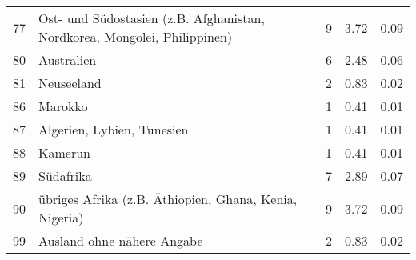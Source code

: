 \begin{longtable}{lXrrr}
        77 & \multicolumn{1}{X}{Ost- und Südostasien (z.B. Afghanistan, Nordkorea, Mongolei, Philippinen)} & %
          \num{9} &
          \num[round-mode=places,round-precision=2]{3,72} &
          \num[round-mode=places,round-precision=2]{0,09} \\

        80 & \multicolumn{1}{X}{Australien} & %
          \num{6} &
          \num[round-mode=places,round-precision=2]{2,48} &
          \num[round-mode=places,round-precision=2]{0,06} \\

        81 & \multicolumn{1}{X}{Neuseeland} & %
          \num{2} &
          \num[round-mode=places,round-precision=2]{0,83} &
          \num[round-mode=places,round-precision=2]{0,02} \\

        86 & \multicolumn{1}{X}{Marokko} & %
          \num{1} &
          \num[round-mode=places,round-precision=2]{0,41} &
          \num[round-mode=places,round-precision=2]{0,01} \\

        87 & \multicolumn{1}{X}{Algerien, Lybien, Tunesien} & %
          \num{1} &
          \num[round-mode=places,round-precision=2]{0,41} &
          \num[round-mode=places,round-precision=2]{0,01} \\

        88 & \multicolumn{1}{X}{Kamerun} & %
          \num{1} &
          \num[round-mode=places,round-precision=2]{0,41} &
          \num[round-mode=places,round-precision=2]{0,01} \\

        89 & \multicolumn{1}{X}{Südafrika} & %
          \num{7} &
          \num[round-mode=places,round-precision=2]{2,89} &
          \num[round-mode=places,round-precision=2]{0,07} \\

        90 & \multicolumn{1}{X}{übriges Afrika (z.B. Äthiopien, Ghana, Kenia, Nigeria)} & %
          \num{9} &
          \num[round-mode=places,round-precision=2]{3,72} &
          \num[round-mode=places,round-precision=2]{0,09} \\

        99 & \multicolumn{1}{X}{Ausland ohne nähere Angabe} & %
          \num{2} &
          \num[round-mode=places,round-precision=2]{0,83} &
          \num[round-mode=places,round-precision=2]{0,02} \\


\end{longtable}
